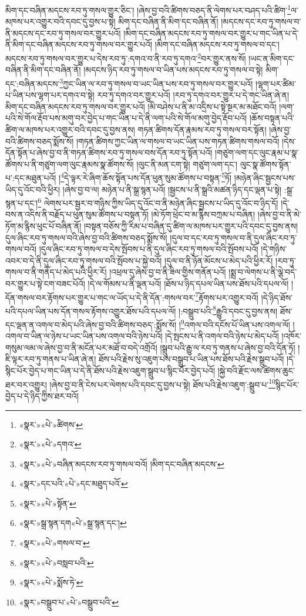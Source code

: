 མིག་དང་བཞིན་མདངས་རབ་ཏུ་གསལ་གྱུར་ཅིང་། །ཞེས་བྱ་བའི་ཚིགས་བཅད་ནི་ལེགས་པར་བཤད་པའི་ཚིག་\footnote{«སྣར་»«པེ་»ཚིགས་}ལ་མཁས་པར་འགྱུར་བའི་དབང་དུ་བྱས་པ་སྟེ། མིག་དང་བཞིན་ནི་མིག་དང་བཞིན་ནོ། །མདངས་དང་རབ་ཏུ་གསལ་བ་ནི་མདངས་དང་རབ་ཏུ་གསལ་བར་གྱུར་པའོ། །མིག་དང་བཞིན་མདངས་རབ་ཏུ་གསལ་བར་གྱུར་པ་གང་ཡིན་པ་དེ་ནི་མིག་དང་བཞིན་མདངས་རབ་ཏུ་གསལ་བར་གྱུར་པའོ། །མིག་དང་བཞིན་མདངས་རབ་ཏུ་གསལ་བ་དང་། མདངས་རབ་ཏུ་གསལ་བར་གྱུར་པ་དེས་རབ་ཏུ་:དགའ་བ་ནི་རབ་ཏུ་དགའ་\footnote{«སྣར་»«པེ་»དགའ་}བར་གྱུར་ནས་སོ། །ཡང་ན་མིག་དང་བཞིན་ནི་མིག་དང་བཞིན་ནོ། །མདངས་ཉིད་རབ་ཏུ་གསལ་བ་ཡིན་པས་མདངས་རབ་ཏུ་གསལ་བ་སྟེ། མིག་དང་:བཞིན་མདངས་\footnote{«སྣར་»«པེ་»བཞིན་མདངས་རབ་ཏུ་གསལ་བའོ། །མིག་དང་བཞིན་མདངས་}ཀྱང་ཡིན་ལ་རབ་ཏུ་གསལ་བ་ཡང་ཡིན་པས་རབ་ཏུ་གསལ་བར་གྱུར་པའོ། །ལྷག་པར་ཚིམ་པ་ཡིན་པས་ལྷག་པར་དགའ་བ་སྟེ། རབ་ཏུ་དགའ་བར་གྱུར་པའོ། །རབ་ཏུ་དགའ་བར་གྱུར་པ་དེ་གང་ཡིན་ཞེ་ན། མིག་དང་བཞིན་མདངས་རབ་ཏུ་གསལ་བར་གྱུར་པའོ། །མི་བཤེས་པ་ནི་མ་འདྲིས་པ་སྟེ་སྔར་མ་མཐོང་བའོ། །ལག་པའི་སེ་གོལ་རྡོབ་པས་མགུ་བར་བྱེད་པ་གང་ཡིན་པ་དེ་ནི་ལག་པའི་སེ་གོལ་མགུ་བྱེད་རྡོབ་པའོ། །ཆོས་བསྟན་པའི་ཚིག་ལ་མཁས་པར་འགྱུར་བའི་དབང་དུ་བྱས་ནས། གཏན་ཚིགས་དོན་རྣམས་རབ་ཏུ་གསལ་བར་སྟོན། །ཞེས་བྱ་བའི་ཚིགས་བཅད་སྨོས་སོ། །གཏན་ཚིགས་ཀྱང་ཡིན་ལ་གསལ་བ་ཡང་ཡིན་པས་གཏན་ཚིགས་གསལ་བའོ། །དེས་དོན་སྟོན་པ་ཞེས་བྱ་བ་ནི་གཏན་ཚིགས་རབ་ཏུ་གསལ་བས་དོན་རབ་ཏུ་སྟོན་པའོ། །གཙུག་ལག་དང་ལུང་རྣམ་པ་སྣ་ཚོགས་པ་ནི་གཙུག་ལག་ལུང་རྣམས་སྣ་ཚོགས་སོ། །ལུང་ནི་མན་ངག་སྟེ། གཙུག་ལག་དང་། ལུང་སྣ་ཚོགས་སྟོན་པ་:དང་མཐུན་པའོ། །\footnote{«སྣར་»དང་པའི་«པེ་»དང་མཐུད་པའོ་}དེ་ལྟར་རེ་ཞིག་ཆོས་སྟོན་པས་དོན་ཕུན་སུམ་ཚོགས་པ་བསྟན་\footnote{«སྣར་»«པེ་»སྟོན་}ཏོ། །མཉེན་ཞིང་སྦྱངས་པས་ཡིད་དུ་འོང་བའི་ཕྱིར། །ཞེས་བྱ་བ་ལ། མཉེན་པ་ནི་སྒྲ་སྙན་པའོ། །སྦྱངས་པ་ནི་སྒྲའི་མཚན་ཉིད་དང་ལྡན་པ་སྟེ། :སྒྲ་སྙན་པ་དང་།\footnote{«སྣར་»སྒྲ་སྙན་དག«པེ་»སྒྲ་སྙན་དང་།} ལེགས་པར་སྦྱར་བ་གཉིས་ཀྱིས་ཡིད་དུ་འོང་བ་ནི་མཉེན་ཞིང་སྦྱངས་པ་ཡིད་དུ་འོང་བ་ཉིད་དོ། །དེ་བས་ན་འདིས་ནི་བརྗོད་པ་ཕུན་སུམ་ཚོགས་པ་བསྟན་ཏོ། །མེ་ཏོག་ཕྲེང་བ་མ་རྙིས་བཀྲམ་པ་བཞིན། །ཞེས་བྱ་བ་ནི་མེ་ཏོག་མ་རྙིས་ཕུང་པོ་བཞིན་ནོ། །བསྟན་བཅོས་ཀྱི་རིམ་པ་བཞིན་དུ་ཚིག་ལ་མཁས་པར་གྱུར་པའི་དབང་དུ་བྱས་ནས། དུལ་ཞིང་རབ་ཏུ་གསལ་བའི་ཞེས་བྱ་བའི་ཚིགས་བཅད་སྨོས་སོ། །དུལ་བ་དང་རབ་ཏུ་གསལ་བ་ནི་དུལ་ཞིང་རབ་ཏུ་གསལ་བའོ། །དུལ་ཞིང་རབ་ཏུ་གསལ་བ་དེས་སྤོབས་པ་ནི་དུལ་ཞིང་རབ་ཏུ་གསལ་བའི་སྤོབས་པའོ། །དེ་གཉིས་འབར་བ་དེ་ནི་དུལ་ཞིང་རབ་ཏུ་གསལ་བའི་སྤོབས་པ་སྐྱེ་བའོ། །དུལ་བ་ནི་ཉོན་མོངས་པ་མེད་པའི་ཕྱིར་རོ། །རབ་ཏུ་གསལ་བ་ནི་གནོད་པ་མེད་པའི་ཕྱིར་རོ། །འཕྲལ་དུ་ཞེས་བྱ་བ་ནི་ཟིལ་གྱིས་གནོན་པའོ། །སྨྲ་བ་ལེགས་པ་ནི་ལྕེ་བདེ་བར་གྱུར་པ་སྟེ་ངག་བཟང་པོའོ། །དེ་ལ་གོམས་པ་ནི་ལྡན་པའོ། །ཐོས་པ་ཉིད་དཔལ་ཡིན་པས་ཐོས་པའི་དཔལ་ལོ། །དོན་གསལ་བར་རྟོགས་པར་གྱུར་པ་གང་ལ་ཡོད་པ་དེ་ནི་དོན་:གསལ་བར་\footnote{«སྣར་»«པེ་»གསལ་བ་}རྟོགས་པར་འགྱུར་བའོ། །དེ་ཉིད་ཐོས་པའི་དཔལ་ཡིན་པས་དོན་གསལ་རྟོགས་འགྱུར་ཐོས་པའི་དཔལ་ལོ། །:བསྒྲུབ་པའི་\footnote{«སྣར་»«པེ་»བསླབ་པའི་}རྒྱུའི་དབང་དུ་བྱས་ནས། ཐོས་དང་ལྡན་ན་འགལ་བ་མེད་པའི་ཞེས་བྱ་བའི་ཚིགས་བཅད་:སྨོས་སོ། །\footnote{«སྣར་»«པེ་»སྨོས་ཏེ་}འགལ་བའི་དངོས་པོ་ཡིན་པས་འགལ་ལོ། །འགལ་བ་ཡིན་ལ་ཉེས་པ་ཡང་ཡིན་པས་འགལ་བའི་ཉེས་པའོ། །དེ་སྤངས་པ་ནི་འགལ་བའི་ཉེས་པ་མེད་པའོ། །འཁོར་གསུམ་ལམ་ལ་ཞེས་བྱ་བ་ནི་མངོན་པར་མཐོ་བ་བདེ་འགྲོའོ། །སྒྲུབ་པའི་རྒྱུ་ལ་རབ་ཏུ་གནས་པ་ཞེས་བྱ་བའི་དོན་ཏོ། །ཇི་ལྟར་རབ་ཏུ་གནས་པ་ཡིན་ཞེ་ན། ཐོས་པའི་རྗེས་སུ་འཇུག་པས་བསྒྲུབ་པ་ཡིན་པས་ཐོས་པའི་རྗེས་སྒྲུབ་པའོ། །དེ་སྙིང་པོར་བྱེད་པ་གང་ཡིན་པ་དེ་ནི་ཐོས་པའི་རྗེས་འཇུག་སྒྲུབ་པ་སྙིང་པོར་བྱེད་པའོ། །སྐྱེ་བའི་རྫོང་ལས་ཚེགས་ཆུང་ཐར་བར་འགྱུར། །ཞེས་བྱ་བ་ནི་ངེས་པར་ལེགས་པའི་དབང་དུ་བྱས་པ་སྟེ། ཐོས་པའི་རྗེས་འཇུག་:སྒྲུབ་པ་\footnote{«སྣར་»བསྒྲུབ་པ་«པེ་»བསྒྲུབ་པའི་}སྙིང་པོར་བྱེད་པ་དེ་ཉིད་ཀྱིས་ཐར་བའོ། 